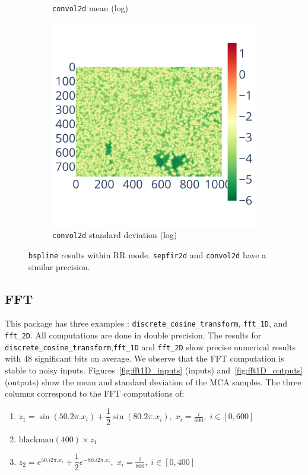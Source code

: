 \begin{figure}
\begin{subfigure}{0.3\linewidth}
        \caption{\centering\texttt{convol2d} mean (log)}
        \label{fig:bspline_convol2d_mean}
    \end{subfigure}
    \begin{subfigure}{0.3\linewidth}
        \includegraphics[width=\linewidth]{figure/bspline/convol2d_std_log.pdf}
        \caption{\centering\texttt{convol2d} standard deviation (log)}
        \label{fig:bspline_convol2d_std}
    \end{subfigure}
    \caption{\texttt{bspline} results within RR mode. \texttt{sepfir2d} and
        \texttt{convol2d} have a similar precision.
    }
    \label{fig:bspline_rr}
\end{figure}

\subsection{FFT}

This package has three examples : \texttt{discrete\_cosine\_transform},
\texttt{fft\_1D}, and \texttt{fft\_2D}. All computations are done in double
precision. The results for \texttt{discrete\_cosine\_transform},\texttt{fft\_1D}
and  \texttt{fft\_2D} show precise numerical results with 48 significant bits on
average. We observe that the FFT computation is stable to noisy inputs.
Figures~\ref{fig:fft1D_inputs} (inputs) and~\ref{fig:fft1D_outputs} (outputs)
show the mean and standard deviation of the MCA samples. The three columns
correspond to the FFT computations of:
\begin{enumerate}
    \item $z_1 = \sin(50 . 2\pi . x_i) + \dfrac{1}{2} \sin(80 . 2\pi . x_i),\; x_i = \frac{i}{600},\; i \in [0,600]$
    \item $\mathrm{blackman}(400) \times z_1$
    \item $ z_2= e^{50 . i 2\pi . x_i} + \dfrac{1}{2} e^{-80 . i2\pi .x_i },\; x_i = \frac{i}{800},\; i \in [0,400] $
\end{enumerate}

